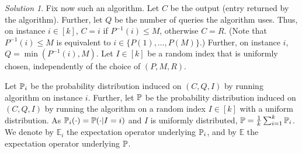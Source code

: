 \documentclass{article}
\DeclareMathOperator*{\1}{\mathbbm{1}}
\newcommand{\E}{\mathbb E}
\newcommand{\0}{\mathbf{0}}
\theoremstyle{definition}
\theoremstyle{remark}
\newtheorem*{solution*}{Solution}
\theoremstyle{theorem}
\begin{document}
\begin{solution*}
Fix now such an algorithm.
Let $C$ be the output (entry returned by the algorithm).
Further, let $Q$ be the number of queries the algorithm uses.
Thus, on instance $i\in [k]$, $C=i$ if $P^{-1}(i)\le M$,
otherwise $C=R$. (Note that $P^{-1}(i)\le M$ is equivalent to $i\in \{P(1),\dots,P(M)\}$.)
Further, on instance $i$, $Q=\min(P^{-1}(i),M)$.
Let $I\in [k]$ be a random index that is uniformly chosen, independently of the choice of $(P,M,R)$.

Let $\mathbb{P}_i$ be the probability distribution induced on $(C,Q,I)$ by running algorithm on instance $i$.
Further, let $\mathbb{P}$ be the probability distribution induced on $(C,Q,I)$ by running the algorithm on a random index $I\in [k]$ with a uniform distribution.
As $\mathbb{P}_i(\cdot) = \mathbb{P}(\cdot|I=i)$ and $I$ is uniformly distributed,
$\mathbb{P} = \frac1k \sum_{i=1}^k \mathbb{P}_i$. We denote by $\E_i$ the expectation operator underlying $\mathbb{P}_i$, and by $\E$ the expectation operator underlying $\mathbb{P}$.


\end{solution*}
\end{document}

